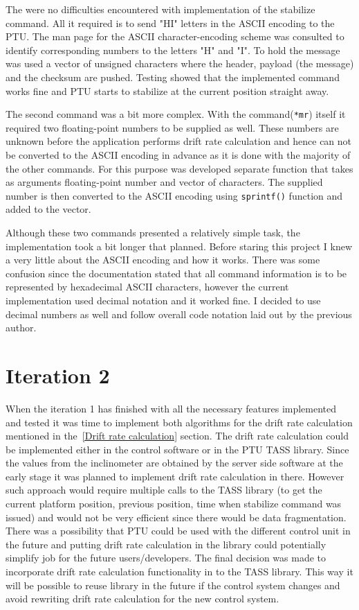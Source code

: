 The were no difficulties encountered with implementation of the stabilize command. All it required is to send "HI" letters in the ASCII encoding to the PTU. The man page for the ASCII character-encoding scheme was consulted to identify corresponding numbers to the letters "H" and "I". To hold the message was used a vector of unsigned characters where the header, payload (the message) and the checksum are pushed. Testing showed that the implemented command works fine and PTU starts to stabilize at the current position straight away. 

The second command was a bit more complex. With the command(\texttt{*mr}) itself it required two floating-point numbers to be supplied as well. These numbers are unknown before the application performs drift rate calculation and hence can not be converted to the ASCII encoding in advance as it is done with the majority of the other commands. For this purpose was developed separate function that takes as arguments floating-point number and vector of characters. The supplied number is then converted to the ASCII encoding using \texttt{sprintf()} function and added to the vector. 

Although these two commands presented a relatively simple task, the implementation took a bit longer that planned. Before staring this project I knew a very little about the ASCII encoding and how it works. There was some confusion since the documentation stated that all command information is to be represented by hexadecimal ASCII characters, however the current implementation used decimal notation and it worked fine. I decided to use decimal numbers as well and follow overall code notation laid out by the previous author.   
 
\section{Iteration 2}
When the iteration 1 has finished with all the necessary features implemented and tested it was time to implement both algorithms for the drift rate calculation mentioned in the~\ref{Drift rate calculation} section. The drift rate calculation could be implemented either in the control software or in the PTU TASS library. Since the values from the inclinometer are obtained by the server side software at the early stage it was planned to implement drift rate calculation in there. However such approach would require multiple calls to the TASS library (to get the current platform position, previous position, time when stabilize command was issued) and would not be very efficient since there would be data fragmentation. There was a possibility that PTU could be used with the different control unit in the future and putting drift rate calculation in the library could potentially simplify job for the future users/developers. The final decision was made to incorporate drift rate calculation functionality in to the TASS library. This way it will be possible to reuse library in the future if the control system changes and avoid rewriting drift rate calculation for the new control system.    

